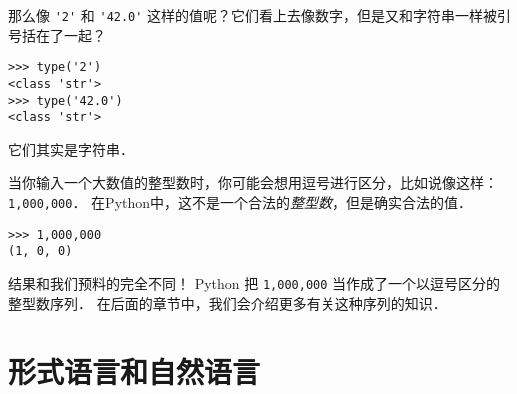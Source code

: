 那么像 \lstinline{'2'} 和 \lstinline{'42.0'} 这样的值呢？它们看上去像数字，但是又和字符串一样被引号括在了一起？
  

\begin{lstlisting}
>>> type('2')
<class 'str'>
>>> type('42.0')
<class 'str'>
\end{lstlisting}

%

它们其实是字符串．


当你输入一个大数值的整型数时，你可能会想用逗号进行区分，比如说像这样：\lstinline{1,000,000}． 在Python中，这不是一个合法的{\em 整型数}，但是确实合法的值．

\begin{lstlisting}
>>> 1,000,000
(1, 0, 0)
\end{lstlisting}
%

结果和我们预料的完全不同！ Python 把 \lstinline{1,000,000} 当作成了一个以逗号区分的整型数序列． 在后面的章节中，我们会介绍更多有关这种序列的知识．



\section{形式语言和自然语言}
  
  
  
  



